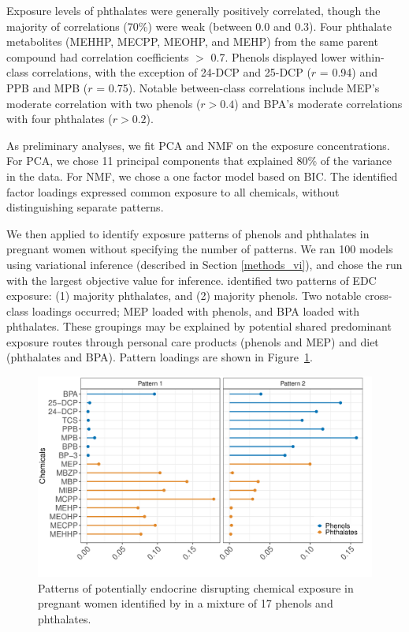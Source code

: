 Exposure levels of phthalates were generally positively correlated, though the majority of correlations (70\%) were weak (between 0.0 and 0.3). Four phthalate metabolites (MEHHP, MECPP, MEOHP, and MEHP) from the same parent compound had correlation coefficients $>$ 0.7. Phenols displayed lower within-class correlations, with the exception of 24-DCP and 25-DCP ($r$ = 0.94) and PPB and MPB ($r$ = 0.75). Notable between-class correlations include MEP's moderate correlation with two phenols ($r > 0.4$) and BPA's moderate correlations with four phthalates ($r > 0.2$).

As preliminary analyses, we fit PCA and NMF on the exposure concentrations. For PCA, we chose 11 principal components that explained 80\% of the variance in the data. For NMF, we chose a one factor model based on BIC. The identified factor loadings expressed common exposure to all chemicals, without distinguishing separate patterns.

We then applied \bnmf to identify exposure patterns of phenols and phthalates in pregnant women without specifying the number of patterns. We ran 100 models using variational inference (described in Section \ref{methods_vi}), and chose the run with the largest objective value for inference. \bnmf identified two patterns of EDC exposure: (1) majority phthalates, and (2) majority phenols. Two notable cross-class loadings occurred; MEP loaded with phenols, and BPA loaded with phthalates. These groupings may be explained by potential shared predominant exposure routes through personal care products (phenols and MEP) and diet (phthalates and BPA). Pattern loadings are shown in Figure~\ref{fig:patterns}. 

\begin{figure}[!htbp]
\caption[Patterns of EDC exposure]{Patterns of potentially endocrine disrupting chemical exposure in pregnant women identified by \bnmf in a mixture of 17 phenols and phthalates.}
\label{fig:patterns}
\centering
\includegraphics[scale = 0.3]{./figures/mn2_edc_loadings_flip.pdf}
\end{figure}


